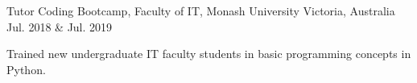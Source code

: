 \begin{cventries}
  \cventry
    {Tutor}
    {Coding Bootcamp, Faculty of IT, Monash University}
    {Victoria, Australia}
    {Jul. 2018 \& Jul. 2019}
    {
      \begin{cvitems}
        \item {Trained new undergraduate IT faculty students in basic programming concepts in Python.}
      \end{cvitems}
    }
\end{cventries}
